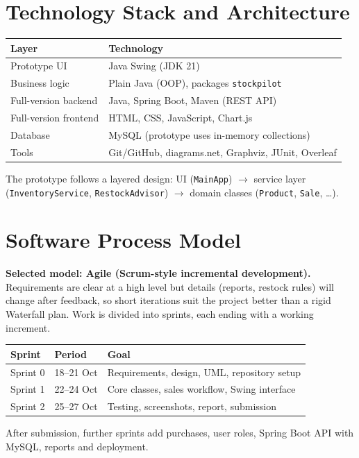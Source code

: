 \documentclass[11pt,a4paper]{article}
\begin{document}
\section{Technology Stack and Architecture}
\begin{table}[H]\centering\begin{tabular}{ll}\toprule
\textbf{Layer} & \textbf{Technology}\\\midrule
Prototype UI & Java Swing (JDK 21)\\
Business logic & Plain Java (OOP), packages \texttt{stockpilot}\\
Full-version backend & Java, Spring Boot, Maven (REST API)\\
Full-version frontend & HTML, CSS, JavaScript, Chart.js\\
Database & MySQL (prototype uses in-memory collections)\\
Tools & Git/GitHub, diagrams.net, Graphviz, JUnit, Overleaf\\\bottomrule
\end{tabular}\end{table}
The prototype follows a layered design: UI (\texttt{MainApp}) $\rightarrow$ service layer (\texttt{InventoryService}, \texttt{RestockAdvisor}) $\rightarrow$ domain classes (\texttt{Product}, \texttt{Sale}, \dots).

\section{Software Process Model}
\textbf{Selected model: Agile (Scrum-style incremental development).} Requirements are clear at a high level but details (reports, restock rules) will change after feedback, so short iterations suit the project better than a rigid Waterfall plan. Work is divided into sprints, each ending with a working increment.
\begin{table}[H]\centering\begin{tabular}{llp{6cm}}\toprule
\textbf{Sprint} & \textbf{Period} & \textbf{Goal}\\\midrule
Sprint 0 & 18--21 Oct & Requirements, design, UML, repository setup\\
Sprint 1 & 22--24 Oct & Core classes, sales workflow, Swing interface\\
Sprint 2 & 25--27 Oct & Testing, screenshots, report, submission\\\bottomrule
\end{tabular}\end{table}
After submission, further sprints add purchases, user roles, Spring Boot API with MySQL, reports and deployment.
\end{document}
